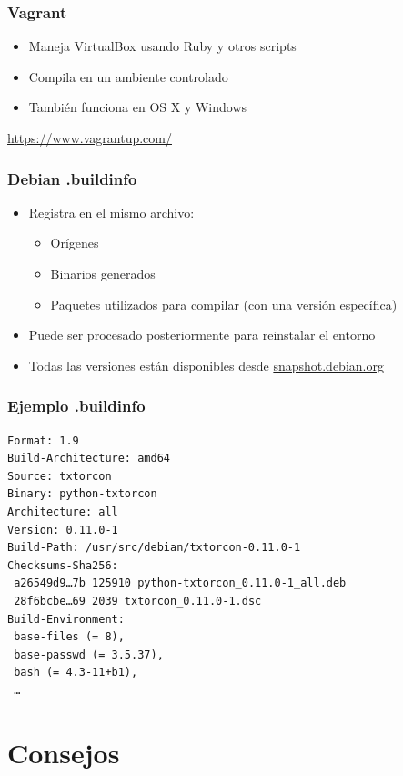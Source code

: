 \documentclass[14pt,aspectratio=169]{beamer}
\begin{document}
\begin{frame}
 \frametitle{Vagrant}

 \begin{itemize}
  \item Maneja VirtualBox usando Ruby y otros scripts
  \item Compila en un ambiente controlado
  \item También funciona en OS X y Windows
 \end{itemize}

 \vfill
 {\footnotesize
 \url{https://www.vagrantup.com/}
 }
\end{frame}

\begin{frame}
 \frametitle{Debian .buildinfo}

 \begin{itemize}
  \item Registra en el mismo archivo:
   \begin{itemize}
    \item Orígenes
    \item Binarios generados
    \item Paquetes utilizados para compilar (con una versión específica)
   \end{itemize}
  \item Puede ser procesado posteriormente para reinstalar el entorno
  \item Todas las versiones están disponibles desde \url{snapshot.debian.org}
 \end{itemize}
\end{frame}

\begin{frame}[fragile]
 \frametitle{Ejemplo .buildinfo}

{\small
\begin{verbatim}
Format: 1.9
Build-Architecture: amd64
Source: txtorcon
Binary: python-txtorcon
Architecture: all
Version: 0.11.0-1
Build-Path: /usr/src/debian/txtorcon-0.11.0-1
Checksums-Sha256:
 a26549d9…7b 125910 python-txtorcon_0.11.0-1_all.deb
 28f6bcbe…69 2039 txtorcon_0.11.0-1.dsc
Build-Environment:
 base-files (= 8),
 base-passwd (= 3.5.37),
 bash (= 4.3-11+b1),
 …
\end{verbatim}
}
\end{frame}

\section{Consejos}
\end{document}
